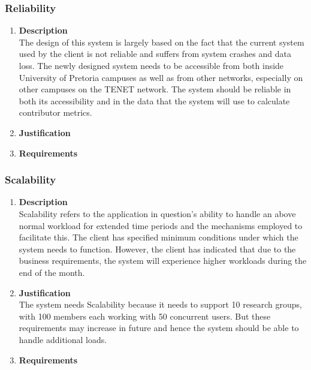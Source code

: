 \documentclass[a4paper,10pt]{article}
\begin{document}
	\subsubsection{Reliability}
		\begin{enumerate}
			\item \textbf{Description} \\
				The design of this system is largely based on the fact that the current system used by the client is not reliable and suffers from system crashes and data loss. The newly designed system needs to be accessible from both inside University of Pretoria campuses as well as from other networks, especially on other campuses on the TENET network. The system should be reliable in both its accessibility and in the data that the system will use to calculate contributor metrics. 

			\item \textbf{Justification} \\
			\item \textbf{Requirements}\\
		\end{enumerate}

	\subsubsection{Scalability}
		\begin{enumerate}
			\item \textbf{Description} \\
				Scalability refers to the application in question's ability to handle an above normal workload for extended time periods and the mechanisms employed to facilitate this. The client has specified minimum conditions under which the system needs to function. However, the client has indicated that due to the business requirements, the system will experience higher workloads during the end of the month.

			\item \textbf{Justification} \\
				The system needs Scalability because it needs to support 10 research groups, with 100 members each working with 50 concurrent users. But these requirements may increase in future and hence the system should be able to handle additional loads.

			\item \textbf{Requirements}\\
		\end{enumerate}
\end{document}
